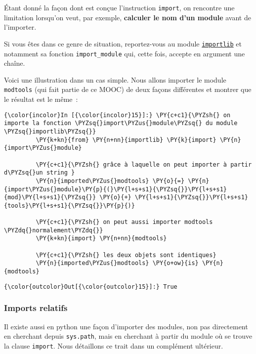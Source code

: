    Étant donné la façon dont est conçue l'instruction \texttt{import}, on
rencontre une limitation lorsqu'on veut, par exemple, \textbf{calculer
le nom d'un module} avant de l'importer.

Si vous êtes dans ce genre de situation, reportez-vous au module
\href{https://docs.python.org/3/library/importlib.html}{\texttt{importlib}}
et notamment sa fonction \texttt{import\_module} qui, cette fois,
accepte en argument une chaîne.

    Voici une illustration dans un cas simple. Nous allons importer le
module \texttt{modtools} (qui fait partie de ce MOOC) de deux façons
différentes et montrer que le résultat est le même~:

    \begin{Verbatim}[commandchars=\\\{\}]
{\color{incolor}In [{\color{incolor}15}]:} \PY{c+c1}{\PYZsh{} on importe la fonction \PYZsq{}import\PYZus{}module\PYZsq{} du module \PYZsq{}importlib\PYZsq{}}
         \PY{k+kn}{from} \PY{n+nn}{importlib} \PY{k}{import} \PY{n}{import\PYZus{}module}
         
         \PY{c+c1}{\PYZsh{} grâce à laquelle on peut importer à partir d\PYZsq{}un string }
         \PY{n}{imported\PYZus{}modtools} \PY{o}{=} \PY{n}{import\PYZus{}module}\PY{p}{(}\PY{l+s+s1}{\PYZsq{}}\PY{l+s+s1}{mod}\PY{l+s+s1}{\PYZsq{}} \PY{o}{+} \PY{l+s+s1}{\PYZsq{}}\PY{l+s+s1}{tools}\PY{l+s+s1}{\PYZsq{}}\PY{p}{)}
         
         \PY{c+c1}{\PYZsh{} on peut aussi importer modtools \PYZdq{}normalement\PYZdq{}}
         \PY{k+kn}{import} \PY{n+nn}{modtools}
         
         \PY{c+c1}{\PYZsh{} les deux objets sont identiques}
         \PY{n}{imported\PYZus{}modtools} \PY{o+ow}{is} \PY{n}{modtools}
\end{Verbatim}


\begin{Verbatim}[commandchars=\\\{\}]
{\color{outcolor}Out[{\color{outcolor}15}]:} True
\end{Verbatim}
            
    \hypertarget{imports-relatifs}{%
\subsubsection{Imports relatifs}\label{imports-relatifs}}

    Il existe aussi en python une façon d'importer des modules, non pas
directement en cherchant depuis \texttt{sys.path}, mais en cherchant à
partir du module où se trouve la clause \texttt{import}. Nous détaillons
ce trait dans un complément ultérieur.


    
    
    
